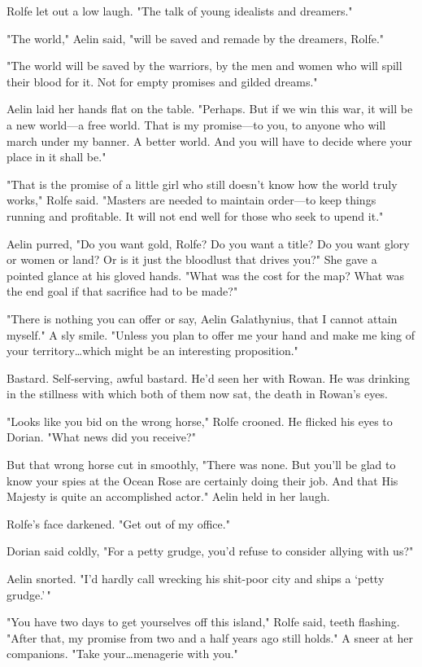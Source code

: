 Rolfe let out a low laugh.
"The talk of young idealists and dreamers."

"The world," Aelin said, "will be saved and remade by the dreamers, Rolfe."

"The world will be saved by the warriors, by the men and women who will spill their blood for it.
Not for empty promises and gilded dreams."

Aelin laid her hands flat on the table.
"Perhaps.
But if we win this war, it will be a new world---a free world.
That is my promise---to you, to anyone who will march under my banner.
A better world.
And you will have to decide where your place in it shall be."

"That is the promise of a little girl who still doesn't know how the world truly works," Rolfe said.
"Masters are needed to maintain order---to keep things running and profitable.
It will not end well for those who seek to upend it."

Aelin purred, "Do you want gold, Rolfe?
Do you want a title?
Do you want glory or women or land?
Or is it just the bloodlust that drives you?"
She gave a pointed glance at his gloved hands.
"What was the cost for the map?
What was the end goal if that sacrifice had to be made?"

"There is nothing you can offer or say, Aelin Galathynius, that I cannot attain myself."
A sly smile.
"Unless you plan to offer me your hand and make me king of your territory\ldots which might be an interesting proposition."

Bastard.
Self-serving, awful bastard.
He'd seen her with Rowan.
He was drinking in the stillness with which both of them now sat, the death in Rowan's eyes.

"Looks like you bid on the wrong horse," Rolfe crooned.
He flicked his eyes to Dorian.
"What news did you receive?"

But that wrong horse cut in smoothly, "There was none.
But you'll be glad to know your spies at the Ocean Rose are certainly doing their job.
And that His Majesty is quite an accomplished actor."
Aelin held in her laugh.

Rolfe's face darkened.
"Get out of my office."

Dorian said coldly, "For a petty grudge, you'd refuse to consider allying with us?"

Aelin snorted.
"I'd hardly call wrecking his shit-poor city and ships a `petty grudge.'\,"

"You have two days to get yourselves off this island," Rolfe said, teeth flashing.
"After that, my promise from two and a half years ago still holds."
A sneer at her companions.
"Take your\ldots menagerie with you."

